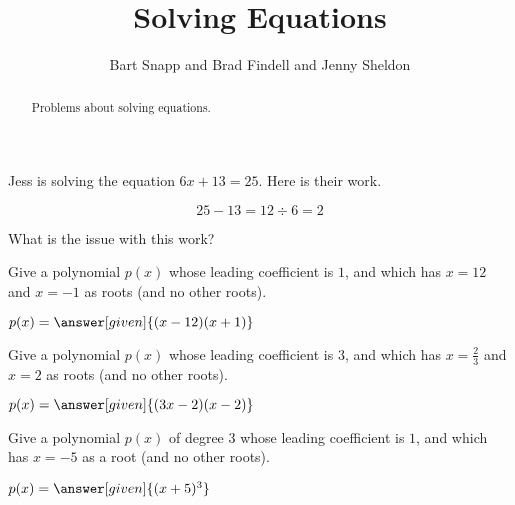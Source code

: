 \documentclass[nooutcomes]{ximera}
\title{Solving Equations}
\author{Bart Snapp and Brad Findell and Jenny Sheldon}
\begin{document}
\begin{abstract}
Problems about solving equations.
\end{abstract}
\maketitle




\begin{problem}
Jess is solving the equation $6x+13 = 25$.  Here is their work.

\[
25 - 13 = 12 \div 6 = 2
\]
\end{problem}

What is the issue with this work?
\begin{multipleChoice}
\end{multipleChoice}



\begin{problem}
Give a polynomial $p(x)$ whose leading coefficient is $1$, and which has $x=12$ and $x=-1$ as roots (and no other roots).

\begin{prompt}
	$p(x) = \answer[given]{(x-12)(x+1)}$
\end{prompt}
\end{problem}



\begin{problem}
Give a polynomial $p(x)$ whose leading coefficient is $3$, and which has $x=\frac{2}{3}$ and $x=2$ as roots (and no other roots).

\begin{prompt}
	$p(x) = \answer[given]{(3x-2)(x-2)}$
\end{prompt}
\end{problem}



\begin{problem}
Give a polynomial $p(x)$ of degree 3 whose leading coefficient is $1$, and which has $x=-5$ as a root (and no other roots).

\begin{prompt}
	$p(x) = \answer[given]{(x+5)^3}$
\end{prompt}
\end{problem}
\end{document}
